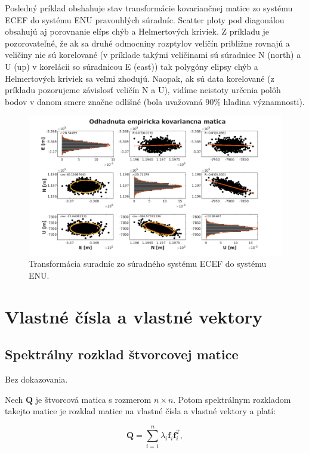 Posledný príklad obshahuje stav transformácie kovariančnej matice zo systému ECEF do systému ENU pravouhlých súradníc. Scatter ploty pod diagonálou obsahujú aj porovnanie elíps chýb a Helmertových kriviek. Z príkladu je pozorovateľné, že ak sa druhé odmocniny rozptylov veličín približne rovnajú a veličiny nie sú korelované (v príklade takými veličinami sú súradnice N (north) a U (up) v korelácii so súradnicou E (east)) tak polygóny elipsy chýb a Helmertových kriviek sa veľmi zhodujú. Naopak, ak sú data korelované (z príkladu pozorujeme závislosť veličín N a U), vidíme neistoty určenia polôh bodov v danom smere značne odlišné (bola uvažovaná $90\%$ hladina významnosti).

\begin{figure}
\includegraphics[width=1.0\textwidth]{FIG/ecef2enu.png}
\caption{Transformácia suradníc zo súradného systému ECEF do systému ENU.}
\end{figure}

\section{Vlastné čísla a vlastné vektory}

\subsection{Spektrálny rozklad štvorcovej matice}

Bez dokazovania.

Nech $\mathbf{Q}$ je štvorcová matica s rozmerom $n\times n$. Potom spektrálnym rozkladom takejto matice je rozklad matice na vlastné čísla a vlastné vektory a platí:

\begin{equation}
\mathbf{Q} = \sum_{i=1}^{n}\lambda_{i}\mathbf{f}_{i}\mathbf{f}_{i}^{T},
\end{equation}

